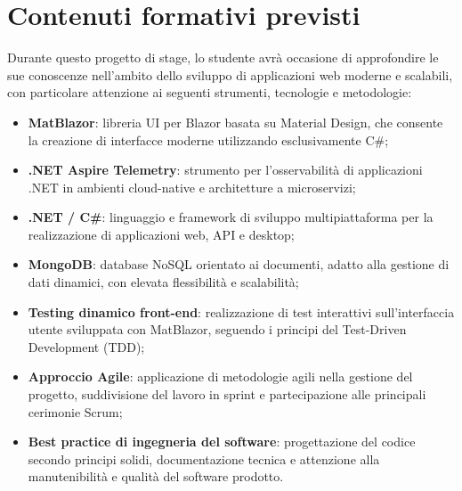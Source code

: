 \section*{Contenuti formativi previsti}
Durante questo progetto di stage, lo studente avrà occasione di approfondire le sue conoscenze nell'ambito dello sviluppo di applicazioni web moderne e scalabili, con particolare attenzione ai seguenti strumenti, tecnologie e metodologie:

\begin{itemize}
    \item \textbf{MatBlazor}: libreria UI per Blazor basata su Material Design, che consente la creazione di interfacce moderne utilizzando esclusivamente C\#;
    
    \item \textbf{.NET Aspire Telemetry}: strumento per l’osservabilità di applicazioni .NET in ambienti cloud-native e architetture a microservizi;
    
    \item \textbf{.NET / C\#}: linguaggio e framework di sviluppo multipiattaforma per la realizzazione di applicazioni web, API e desktop;
    
    \item \textbf{MongoDB}: database NoSQL orientato ai documenti, adatto alla gestione di dati dinamici, con elevata flessibilità e scalabilità;
    
    \item \textbf{Testing dinamico front-end}: realizzazione di test interattivi sull’interfaccia utente sviluppata con MatBlazor, seguendo i principi del Test-Driven Development (TDD);
    
    \item \textbf{Approccio Agile}: applicazione di metodologie agili nella gestione del progetto, suddivisione del lavoro in sprint e partecipazione alle principali cerimonie Scrum;
    
    \item \textbf{Best practice di ingegneria del software}: progettazione del codice secondo principi solidi, documentazione tecnica e attenzione alla manutenibilità e qualità del software prodotto.
\end{itemize}

\newpage
